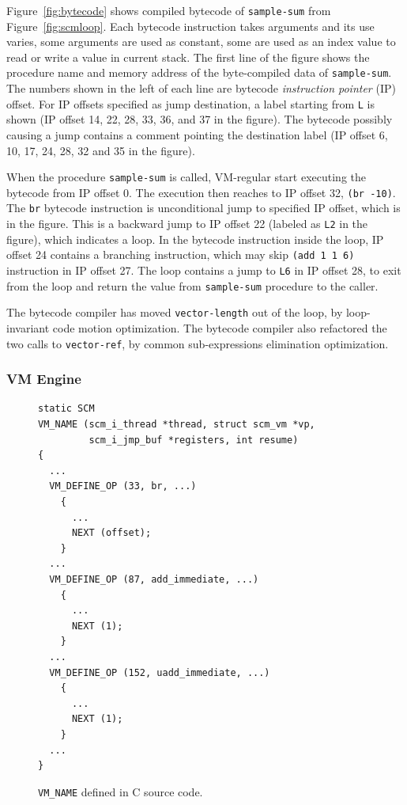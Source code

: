 \documentclass[preprint]{sigplanconf}
\begin{document}
Figure~\hyperref[fig:bytecode]{\ref{fig:bytecode}} shows compiled bytecode of
\texttt{sample-sum} from
Figure~\hyperref[fig:scmloop]{\ref{fig:scmloop}}. Each bytecode instruction
takes arguments and its use varies, some arguments are used as constant, some
are used as an index value to read or write a value in current stack. The
first line of the figure shows the procedure name and memory address of the
byte-compiled data of \texttt{sample-sum}. The numbers shown in the left of
each line are bytecode \textit{instruction pointer} (IP) offset. For IP
offsets specified as jump destination, a label starting from \texttt{L} is
shown (IP offset 14, 22, 28, 33, 36, and 37 in the figure). The bytecode
possibly causing a jump contains a comment pointing the destination label (IP
offset 6, 10, 17, 24, 28, 32 and 35 in the figure).

When the procedure \texttt{sample-sum} is called, VM-regular start executing
the bytecode from IP offset 0. The execution then reaches to IP offset 32,
\texttt{(br -10)}. The \texttt{br} bytecode instruction is unconditional jump
to specified IP offset, which is  in the figure. This is a backward jump to
IP offset 22 (labeled as \texttt{L2} in the figure), which indicates a
loop. In the bytecode instruction inside the loop, IP offset 24 contains a
branching instruction, which may skip \texttt{(add 1 1 6)} instruction in IP
offset 27. The loop contains a jump to \texttt{L6} in IP offset 28, to exit
from the loop and return the value from \texttt{sample-sum} procedure to the
caller.

The bytecode compiler has moved \texttt{vector-length} out of the loop, by
loop-invariant code motion optimization. The bytecode compiler also refactored
the two calls to \texttt{vector-ref}, by common sub-expressions elimination
optimization.

\subsubsection{VM Engine}

\begin{figure}
  \centering
\begin{verbatim}
static SCM
VM_NAME (scm_i_thread *thread, struct scm_vm *vp,
         scm_i_jmp_buf *registers, int resume)
{
  ...
  VM_DEFINE_OP (33, br, ...)
    {
      ...
      NEXT (offset);
    }
  ...
  VM_DEFINE_OP (87, add_immediate, ...)
    {
      ...
      NEXT (1);
    }
  ...
  VM_DEFINE_OP (152, uadd_immediate, ...)
    {
      ...
      NEXT (1);
    }
  ...
}
\end{verbatim}
\caption{\texttt{VM\_NAME} defined in C source code.}
\label{fig:vmnameorig}
\end{figure}
\end{document}
